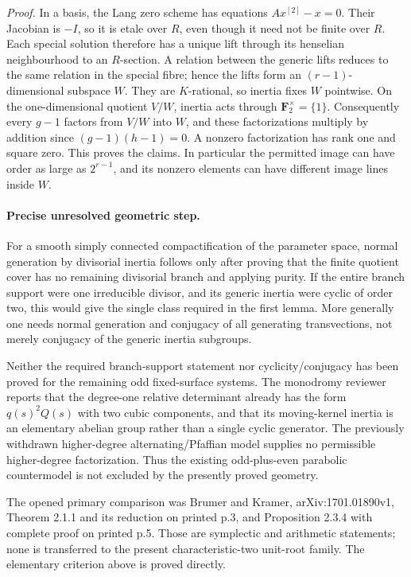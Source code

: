 \emph{Proof.}
In a basis, the Lang zero scheme has equations $A x^{[2]}-x=0$.
Their Jacobian is $-I$, so it is etale over $R$, even though it need
not be finite over $R$. Each special solution therefore has a unique
lift through its henselian neighbourhood to an $R$-section. A relation
between the generic lifts reduces to the same relation in the special
fibre; hence the lifts form an $(r-1)$-dimensional subspace $W$.
They are $K$-rational, so inertia fixes $W$ pointwise. On the
one-dimensional quotient $V/W$, inertia acts through
$\mathbf F_2^\times=\{1\}$. Consequently every $g-1$ factors from
$V/W$ into $W$, and these factorizations multiply by addition since
$(g-1)(h-1)=0$. A nonzero factorization has rank one and square zero.
This proves the claims. In particular the permitted image can have
order as large as $2^{r-1}$, and its nonzero elements can have different
image lines inside $W$.

\paragraph{Precise unresolved geometric step.}
For a smooth simply connected compactification of the parameter space,
normal generation by divisorial inertia follows only after proving
that the finite quotient cover has no remaining divisorial branch and
applying purity. If the entire branch support were one irreducible
divisor, and its generic inertia were cyclic of order two, this would
give the single class required in the first lemma. More generally one
needs normal generation and conjugacy of all generating transvections,
not merely conjugacy of the generic inertia subgroups.

Neither the required branch-support statement nor cyclicity/conjugacy
has been proved for the remaining odd fixed-surface systems.
The monodromy reviewer reports that the degree-one relative determinant
already has the form $q(s)^2Q(s)$ with two cubic components, and that its
moving-kernel inertia is an elementary abelian group rather than a
single cyclic generator. The previously withdrawn higher-degree
alternating/Pfaffian model supplies no permissible higher-degree
factorization. Thus the existing odd-plus-even parabolic countermodel
is not excluded by the presently proved geometry.

The opened primary comparison was Brumer and Kramer, arXiv:1701.01890v1,
Theorem 2.1.1 and its reduction on printed p.3, and Proposition 2.3.4
with complete proof on printed p.5. Those are symplectic and arithmetic
statements; none is transferred to the present characteristic-two
unit-root family. The elementary criterion above is proved directly.
